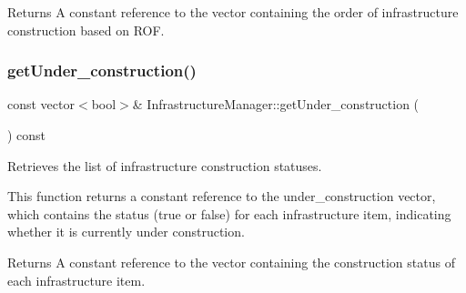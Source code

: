 \begin{DoxyReturn}{Returns}
A constant reference to the vector containing the order of infrastructure construction based on R\+OF. 
\end{DoxyReturn}
\mbox{\label{classInfrastructureManager_ad598850bb18f5a6fc81a0e2bc7885ef2}} 
\subsubsection{\texorpdfstring{get\+Under\+\_\+construction()}{getUnder\_construction()}}
{\footnotesize\ttfamily const vector$<$bool$>$\& Infrastructure\+Manager\+::get\+Under\+\_\+construction (\begin{DoxyParamCaption}{ }\end{DoxyParamCaption}) const}



Retrieves the list of infrastructure construction statuses. 

This function returns a constant reference to the {\ttfamily under\+\_\+construction} vector, which contains the status (true or false) for each infrastructure item, indicating whether it is currently under construction.

\begin{DoxyReturn}{Returns}
A constant reference to the vector containing the construction status of each infrastructure item. 
\end{DoxyReturn}
\mbox{\label{classInfrastructureManager_a06c7a2df105a2a8dd3ef625ad42694ce}} 
